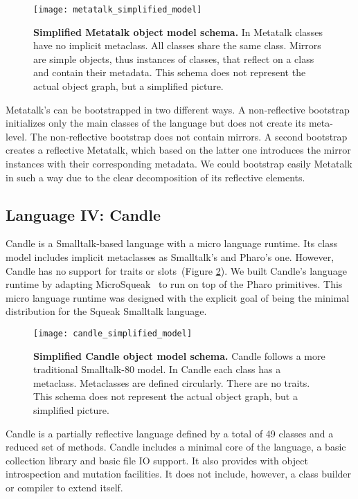 \begin{figure}[ht]
\center
\texttt{[image: metatalk\_simplified\_model]}
\caption{\textbf{Simplified Metatalk object model schema.} In Metatalk classes have no implicit metaclass. All classes share the same class. Mirrors are simple objects, thus instances of classes, that reflect on a class and contain their metadata. This schema does not represent the actual object graph, but a simplified picture.\label{fig:metatalk_simplified_model}}
\end{figure}

Metatalk's can be bootstrapped in two different ways. A non-reflective bootstrap initializes only the main classes of the language but does not create its meta-level. The non-reflective bootstrap does not contain mirrors. A second bootstrap creates a reflective Metatalk, which based on the latter one introduces the mirror instances with their corresponding metadata. We could bootstrap easily Metatalk in such a way due to the clear decomposition of its reflective elements. 

\subsection{Language IV: Candle} \label{sec:bootstrap_candle}

Candle is a Smalltalk-based language with a micro language runtime. Its class model includes implicit metaclasses as Smalltalk's and Pharo's one. However, Candle has no support for traits or slots~(Figure \ref{fig:candle_simplified_model}). We built Candle's language runtime by adapting MicroSqueak~\cite{Malo11a} to run on top of the Pharo \VM primitives. This micro language runtime was designed with the explicit goal of being the minimal distribution for the Squeak Smalltalk language.

\begin{figure}[ht]
\center
\texttt{[image: candle\_simplified\_model]}
\caption{\textbf{Simplified Candle object model schema.} Candle follows a more traditional Smalltalk-80 model. In Candle each class has a metaclass. Metaclasses are defined circularly. There are no traits. This schema does not represent the actual object graph, but a simplified picture.\label{fig:candle_simplified_model}}
\end{figure}


Candle is a partially reflective language defined by a total of 49 classes and a reduced set of methods. Candle includes a minimal core of the language, a basic collection library and basic file IO support. It also provides with object introspection and mutation facilities. It does not include, however, a class builder or compiler to extend itself.%

